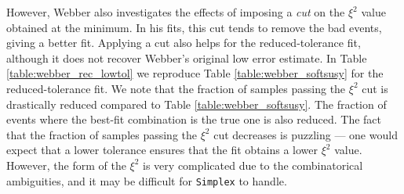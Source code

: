 \documentclass[twoside,english]{uiofysmaster}
\begin{document}


However, Webber also investigates the effects of imposing a {\it cut} on the $\xi^2$ value obtained at the minimum. In his fits, this cut tends to remove the bad events, giving a better fit. Applying a cut also helps for the reduced-tolerance fit, although it does not recover Webber's original low error estimate. In Table \ref{table:webber_rec_lowtol} we reproduce Table \ref{table:webber_softsusy} for the reduced-tolerance fit. We note that the fraction of samples passing the $\xi^2$ cut is drastically reduced compared to Table \ref{table:webber_softsusy}. The fraction of events where the best-fit combination is the true one is also reduced. The fact that the fraction of samples passing the $\xi^2$ cut decreases is puzzling --- one would expect that a lower tolerance ensures that the fit obtains a lower $\xi^2$ value. However, the form of the $\xi^2$ is very complicated due to the combinatorical ambiguities, and it may be difficult for {\tt Simplex} to handle.
\end{document}
